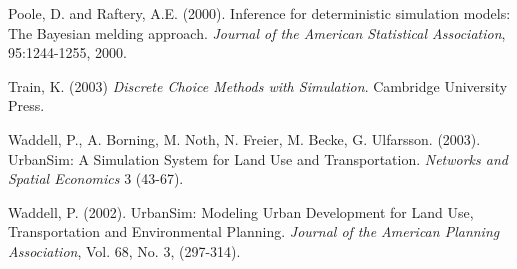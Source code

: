 Poole, D. and Raftery, A.E. (2000). Inference for deterministic simulation models: The Bayesian melding approach. \emph{Journal of the American Statistical Association}, 95:1244-1255, 2000.

Train, K. (2003) \emph{Discrete Choice Methods with Simulation}.  Cambridge University Press.

Waddell, P., A. Borning, M. Noth, N. Freier, M. Becke, G. Ulfarsson. (2003). UrbanSim: A Simulation System for Land Use and Transportation. \emph{Networks and Spatial Economics} 3 (43-67).

Waddell, P. (2002).  UrbanSim: Modeling Urban Development for Land Use, Transportation and Environmental Planning. \emph{ Journal of the American Planning Association}, Vol. 68, No. 3, (297-314).

